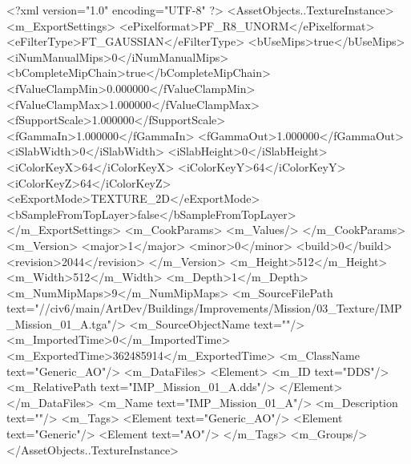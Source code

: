 <?xml version="1.0" encoding="UTF-8" ?>
<AssetObjects..TextureInstance>
	<m_ExportSettings>
		<ePixelformat>PF_R8_UNORM</ePixelformat>
		<eFilterType>FT_GAUSSIAN</eFilterType>
		<bUseMips>true</bUseMips>
		<iNumManualMips>0</iNumManualMips>
		<bCompleteMipChain>true</bCompleteMipChain>
		<fValueClampMin>0.000000</fValueClampMin>
		<fValueClampMax>1.000000</fValueClampMax>
		<fSupportScale>1.000000</fSupportScale>
		<fGammaIn>1.000000</fGammaIn>
		<fGammaOut>1.000000</fGammaOut>
		<iSlabWidth>0</iSlabWidth>
		<iSlabHeight>0</iSlabHeight>
		<iColorKeyX>64</iColorKeyX>
		<iColorKeyY>64</iColorKeyY>
		<iColorKeyZ>64</iColorKeyZ>
		<eExportMode>TEXTURE_2D</eExportMode>
		<bSampleFromTopLayer>false</bSampleFromTopLayer>
	</m_ExportSettings>
	<m_CookParams>
		<m_Values/>
	</m_CookParams>
	<m_Version>
		<major>1</major>
		<minor>0</minor>
		<build>0</build>
		<revision>2044</revision>
	</m_Version>
	<m_Height>512</m_Height>
	<m_Width>512</m_Width>
	<m_Depth>1</m_Depth>
	<m_NumMipMaps>9</m_NumMipMaps>
	<m_SourceFilePath text="//civ6/main/ArtDev/Buildings/Improvements/Mission/03_Texture/IMP_Mission_01_A.tga"/>
	<m_SourceObjectName text=""/>
	<m_ImportedTime>0</m_ImportedTime>
	<m_ExportedTime>362485914</m_ExportedTime>
	<m_ClassName text="Generic_AO"/>
	<m_DataFiles>
		<Element>
			<m_ID text="DDS"/>
			<m_RelativePath text="IMP_Mission_01_A.dds"/>
		</Element>
	</m_DataFiles>
	<m_Name text="IMP_Mission_01_A"/>
	<m_Description text=""/>
	<m_Tags>
		<Element text="Generic_AO"/>
		<Element text="Generic"/>
		<Element text="AO"/>
	</m_Tags>
	<m_Groups/>
</AssetObjects..TextureInstance>

